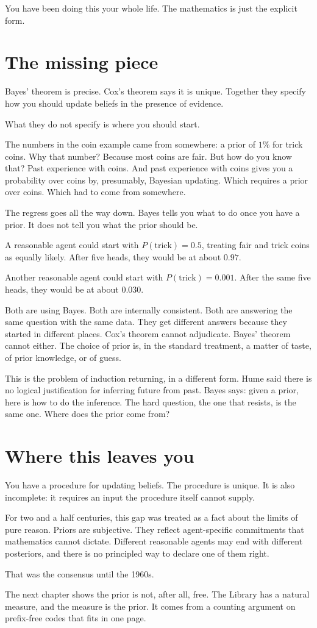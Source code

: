 You have been doing this your whole life. The mathematics is just the explicit form.

\section*{The missing piece}

Bayes' theorem is precise. Cox's theorem says it is unique. Together they specify how you should update beliefs in the presence of evidence.

What they do not specify is where you should start.

The numbers in the coin example came from somewhere: a prior of $1\%$ for trick coins. Why that number? Because most coins are fair. But how do you know that? Past experience with coins. And past experience with coins gives you a probability over coins by, presumably, Bayesian updating. Which requires a prior over coins. Which had to come from somewhere.

The regress goes all the way down. Bayes tells you what to do once you have a prior. It does not tell you what the prior should be.

A reasonable agent could start with $P(\text{trick}) = 0.5$, treating fair and trick coins as equally likely. After five heads, they would be at about $0.97$.

Another reasonable agent could start with $P(\text{trick}) = 0.001$. After the same five heads, they would be at about $0.030$.

Both are using Bayes. Both are internally consistent. Both are answering the same question with the same data. They get different answers because they started in different places. Cox's theorem cannot adjudicate. Bayes' theorem cannot either. The choice of prior is, in the standard treatment, a matter of taste, of prior knowledge, or of guess.

This is the problem of induction returning, in a different form. Hume said there is no logical justification for inferring future from past. Bayes says: given a prior, here is how to do the inference. The hard question, the one that resists, is the same one. Where does the prior come from?

\section*{Where this leaves you}

You have a procedure for updating beliefs. The procedure is unique. It is also incomplete: it requires an input the procedure itself cannot supply.

For two and a half centuries, this gap was treated as a fact about the limits of pure reason. Priors are subjective. They reflect agent-specific commitments that mathematics cannot dictate. Different reasonable agents may end with different posteriors, and there is no principled way to declare one of them right.

That was the consensus until the 1960s.

The next chapter shows the prior is not, after all, free. The Library has a natural measure, and the measure is the prior. It comes from a counting argument on prefix-free codes that fits in one page.
